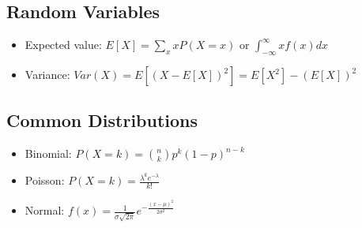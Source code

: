 \documentclass[10pt,a4paper,twocolumn]{article}
\begin{document}
\subsection{Random Variables}
\begin{itemize}[leftmargin=*]
\item Expected value: $E[X] = \sum_x x P(X=x)$ or $\int_{-\infty}^{\infty} x f(x) dx$
\item Variance: $Var(X) = E[(X - E[X])^2] = E[X^2] - (E[X])^2$
\end{itemize}

\subsection{Common Distributions}
\begin{itemize}[leftmargin=*]
\item Binomial: $P(X=k) = \binom{n}{k} p^k (1-p)^{n-k}$
\item Poisson: $P(X=k) = \frac{\lambda^k e^{-\lambda}}{k!}$
\item Normal: $f(x) = \frac{1}{\sigma\sqrt{2\pi}} e^{-\frac{(x-\mu)^2}{2\sigma^2}}$
\end{itemize}
\end{document}
